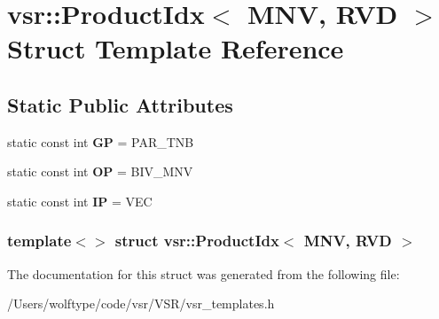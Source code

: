 \hypertarget{structvsr_1_1_product_idx_3_01_m_n_v_00_01_r_v_d_01_4}{\section{vsr\-:\-:Product\-Idx$<$ M\-N\-V, R\-V\-D $>$ Struct Template Reference}
\label{structvsr_1_1_product_idx_3_01_m_n_v_00_01_r_v_d_01_4}
}
\subsection*{Static Public Attributes}
\begin{DoxyCompactItemize}
\item 
\hypertarget{structvsr_1_1_product_idx_3_01_m_n_v_00_01_r_v_d_01_4_a180271295334cabf6079f7c62cbabb6c}{static const int {\bfseries G\-P} = P\-A\-R\-\_\-\-T\-N\-B}\label{structvsr_1_1_product_idx_3_01_m_n_v_00_01_r_v_d_01_4_a180271295334cabf6079f7c62cbabb6c}

\item 
\hypertarget{structvsr_1_1_product_idx_3_01_m_n_v_00_01_r_v_d_01_4_ad8657242e70ae81fe62c2ea7bae74ca5}{static const int {\bfseries O\-P} = B\-I\-V\-\_\-\-M\-N\-V}\label{structvsr_1_1_product_idx_3_01_m_n_v_00_01_r_v_d_01_4_ad8657242e70ae81fe62c2ea7bae74ca5}

\item 
\hypertarget{structvsr_1_1_product_idx_3_01_m_n_v_00_01_r_v_d_01_4_ae3c35c478673c1d566d4ea340d7bc9e3}{static const int {\bfseries I\-P} = V\-E\-C}\label{structvsr_1_1_product_idx_3_01_m_n_v_00_01_r_v_d_01_4_ae3c35c478673c1d566d4ea340d7bc9e3}

\end{DoxyCompactItemize}
\subsubsection*{template$<$$>$ struct vsr\-::\-Product\-Idx$<$ M\-N\-V, R\-V\-D $>$}



The documentation for this struct was generated from the following file\-:\begin{DoxyCompactItemize}
\item 
/\-Users/wolftype/code/vsr/\-V\-S\-R/vsr\-\_\-templates.\-h\end{DoxyCompactItemize}
